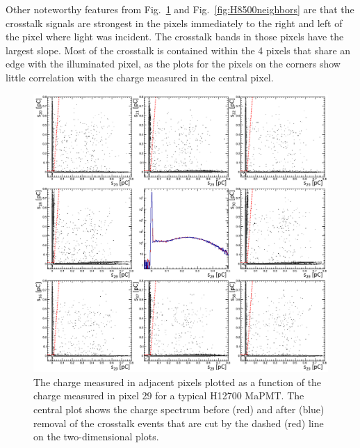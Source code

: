 Other noteworthy features from Fig.~\ref{fig:H12700neighbors} and Fig.~\ref{fig:H8500neighbors} are that the crosstalk signals are strongest in the pixels immediately to the right and left of the pixel where light was incident. The crosstalk bands in those pixels have the largest slope. Most of the crosstalk is contained within the 4 pixels that share an edge with the illuminated pixel, as the plots for the pixels on the corners show little correlation with the charge measured in the central pixel.

\begin{figure}[h!bt]
	\centering
	\includegraphics[width=0.9\linewidth]{figures/H12700_ct_updated.png}
	\caption{The charge measured in adjacent pixels plotted as a function of the charge measured in pixel 29 for a typical H12700 MaPMT. The central plot shows the charge spectrum before (red) and after (blue) removal of the crosstalk events that are cut by the dashed (red) line on the two-dimensional plots.}
	\label{fig:H12700neighbors}
\end{figure}
